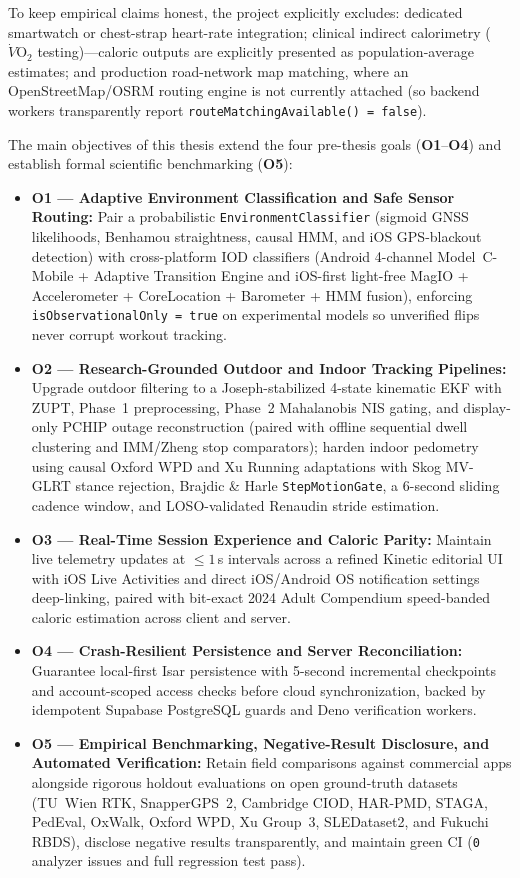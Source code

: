 To keep empirical claims honest, the project explicitly excludes: dedicated smartwatch or chest-strap heart-rate integration; clinical indirect calorimetry ($\dot{V}\text{O}_2$ testing)---caloric outputs are explicitly presented as population-average estimates; and production road-network map matching, where an OpenStreetMap/OSRM routing engine is not currently attached (so backend workers transparently report \texttt{routeMatchingAvailable() = false}).

The main objectives of this thesis extend the four pre-thesis goals (\textbf{O1}--\textbf{O4}) and establish formal scientific benchmarking (\textbf{O5}):
\begin{itemize}
    \item \textbf{O1 --- Adaptive Environment Classification and Safe Sensor Routing:} Pair a probabilistic \texttt{EnvironmentClassifier} (sigmoid GNSS likelihoods, Benhamou straightness, causal HMM, and iOS GPS-blackout detection) with cross-platform IOD classifiers (Android 4-channel Model~C-Mobile + Adaptive Transition Engine and iOS-first light-free MagIO + Accelerometer + CoreLocation + Barometer + HMM fusion), enforcing \texttt{isObservationalOnly = true} on experimental models so unverified flips never corrupt workout tracking.
    \item \textbf{O2 --- Research-Grounded Outdoor and Indoor Tracking Pipelines:} Upgrade outdoor filtering to a Joseph-stabilized 4-state kinematic EKF with ZUPT, Phase~1 preprocessing, Phase~2 Mahalanobis NIS gating, and display-only PCHIP outage reconstruction (paired with offline sequential dwell clustering and IMM/Zheng stop comparators); harden indoor pedometry using causal Oxford WPD and Xu Running adaptations with Skog MV-GLRT stance rejection, Brajdic \& Harle \texttt{StepMotionGate}, a 6-second sliding cadence window, and LOSO-validated Renaudin stride estimation.
    \item \textbf{O3 --- Real-Time Session Experience and Caloric Parity:} Maintain live telemetry updates at $\le 1$\,s intervals across a refined Kinetic editorial UI with iOS Live Activities and direct iOS/Android OS notification settings deep-linking, paired with bit-exact 2024 Adult Compendium speed-banded caloric estimation across client and server.
    \item \textbf{O4 --- Crash-Resilient Persistence and Server Reconciliation:} Guarantee local-first Isar persistence with 5-second incremental checkpoints and account-scoped access checks before cloud synchronization, backed by idempotent Supabase PostgreSQL guards and Deno verification workers.
    \item \textbf{O5 --- Empirical Benchmarking, Negative-Result Disclosure, and Automated Verification:} Retain field comparisons against commercial apps alongside rigorous holdout evaluations on open ground-truth datasets (TU~Wien RTK, SnapperGPS~2, Cambridge CIOD, HAR-PMD, STAGA, PedEval, OxWalk, Oxford WPD, Xu Group~3, SLEDataset2, and Fukuchi RBDS), disclose negative results transparently, and maintain green CI (\texttt{0} analyzer issues and full regression test pass).
\end{itemize}

